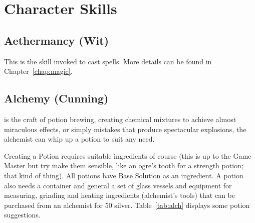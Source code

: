 \documentclass[a4paper,11pt,oneside]{book}
\newcommand{\textlf}[1]{\textbf{\titlecap{#1}}}
\begin{document}
\chapter{Character Skills}

\section{Aethermancy (Wit)}
This is the skill invoked to cast spells. More details can be found in Chapter~\ref{chap:magic}.

\section{Alchemy (Cunning)}
\textlf{Alchemy} is the craft of potion brewing, creating chemical mixtures to achieve almost miraculous effects, or simply mistakes that produce spectacular explosions, the alchemist can whip up a potion to suit any need.

Creating a Potion requires suitable ingredients of course (this is up to the Game Master but try make them sensible, like an ogre's tooth for a strength potion; that kind of thing). All potions have Base Solution as an ingredient. A potion also needs a container and general a set of glass vessels and equipment for measuring, grinding and heating ingredients (alchemist's tools) that can be purchased from an alchemist for 50 silver.
Table~\ref{tab:alch} displays some potion suggestions.
\end{document}
